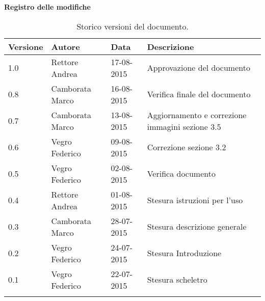 \begin{Large}
	\textbf{Registro delle modifiche}
\end{Large}

\begin{longtable}{|l|l|l|p{}|}
\hline
\textbf{Versione} & \textbf{Autore} & \textbf{Data} & \textbf{Descrizione} \\
\hline
1.0 & Rettore Andrea & 17-08-2015 & Approvazione del documento \\
\hline
0.8 & Camborata Marco & 16-08-2015 & Verifica finale del documento \\
\hline
0.7 & Camborata Marco & 13-08-2015 & Aggiornamento e correzione immagini sezione 3.5 \\
\hline
0.6 & Vegro Federico & 09-08-2015 & Correzione sezione 3.2 \\
\hline
0.5 & Vegro Federico & 02-08-2015 & Verifica documento \\
\hline
0.4 & Rettore Andrea & 01-08-2015 & Stesura istruzioni per l'uso \\
\hline
0.3 & Camborata Marco & 28-07-2015 & Stesura descrizione generale \\
\hline
0.2 & Vegro Federico & 24-07-2015 & Stesura Introduzione \\
\hline
0.1 & Vegro Federico & 22-07-2015 & Stesura scheletro \\
\hline
\caption{Storico versioni del documento.}
\end{longtable}
